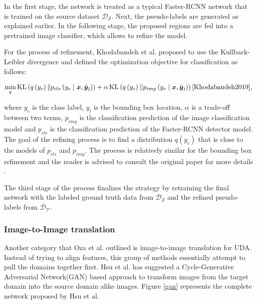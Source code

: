 \documentclass[english, 12pt, a4paper, elec, utf8, a-1b, online]{aaltothesis}
\begin{document}
In the first stage, the network is treated as a typical Faster-RCNN network that is trained on the source dataset $\mathcal{D_S}$. Next, the pseudo-labels are generated as explained earlier. In the following stage, the proposed regions are fed into a pretrained image classifier, which allows to refine the model.

For the process of refinement, Khodabandeh et al. proposed to use the Kullback-Leibler divergence and defined the optimization objective for classification as follows: 

\begin{equation}
\min _{q} \operatorname{KL}\left(q\left(y_{c}\right) \| p_{c l s}\left(y_{c} \mid \boldsymbol{x}, \tilde{\boldsymbol{y}}_{l}\right)\right)+\alpha \operatorname{KL}\left(q\left(y_{c}\right)|| p_{i m g}\left(y_{c} \mid \boldsymbol{x}, \tilde{\boldsymbol{y}}_{l}\right)\right)
\label{KL_DV} 
\cite{Khodabandeh2019},
\end{equation}

where $y_c$ is the class label, $y_l$ is the bounding box location, $\alpha$ is a trade-off between two terms,  $p_{img}$ is the classification prediction of the image classification model and $p_{cls}$ is the classification prediction of the Faster-RCNN detector model. The goal of the refining process is to find a distribution $q(y_c)$ that is close to the models of $p_{cls}$ and $p_{img}$. The process is relatively similar for the bounding box refinement and the reader is advised to consult the original paper for more details \cite{Khodabandeh2019}.  

The third stage of the process finalizes the strategy by retraining the final network with the labeled ground truth data from $\mathcal{D_S}$ and the refined pseudo-labels from $\dot{\mathcal{D_T}}$. 


\subsubsection{Image-to-Image translation}
\label{imagetoimage} 
Another category that Oza et al.\cite{Oza2021} outlined is image-to-image translation for UDA. Instead of trying to align features, this group of methods essentially attempt to pull the domains together first. Hsu et al.\cite{Hsu2019} has suggested a Cycle-Generative Adversarial Network(GAN)\cite{Zhu2017} based approach to transform images from the target domain into the source domain alike images. Figure \ref{gan} represents the complete network proposed by Hsu et al. 
\end{document}
